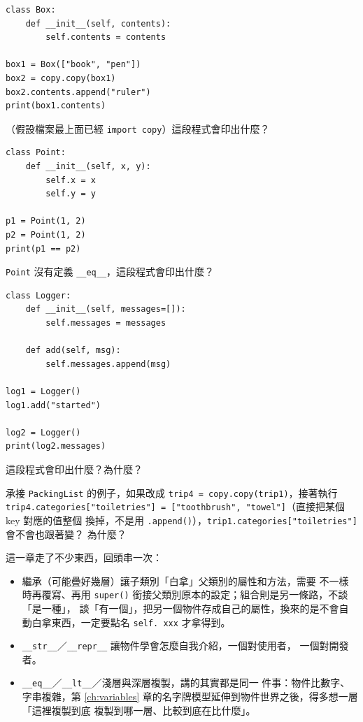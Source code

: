 \begin{drills}[label=drills:copy-and-equality]
\item
\begin{verbatim}
class Box:
    def __init__(self, contents):
        self.contents = contents

box1 = Box(["book", "pen"])
box2 = copy.copy(box1)
box2.contents.append("ruler")
print(box1.contents)
\end{verbatim}
（假設檔案最上面已經 \texttt{import copy}）這段程式會印出什麼？
\item
\begin{verbatim}
class Point:
    def __init__(self, x, y):
        self.x = x
        self.y = y

p1 = Point(1, 2)
p2 = Point(1, 2)
print(p1 == p2)
\end{verbatim}
\texttt{Point} 沒有定義 \texttt{\_\_eq\_\_}，這段程式會印出什麼？
\item
\begin{verbatim}
class Logger:
    def __init__(self, messages=[]):
        self.messages = messages

    def add(self, msg):
        self.messages.append(msg)

log1 = Logger()
log1.add("started")

log2 = Logger()
print(log2.messages)
\end{verbatim}
這段程式會印出什麼？為什麼？
\item 承接 \texttt{PackingList} 的例子，如果改成
\texttt{trip4 = copy.copy(trip1)}，接著執行
\texttt{trip4.categories["toiletries"] = ["toothbrush", "towel"]}（直接把某個 key 對應的值整個
換掉，不是用 \texttt{.append()}），\texttt{trip1.categories["toiletries"]} 會不會也跟著變？
為什麼？
\end{drills}

這一章走了不少東西，回頭串一次：

\begin{itemize}
\item 繼承（可能疊好幾層）讓子類別「白拿」父類別的屬性和方法，需要
不一樣時再覆寫、再用 \texttt{super()} 銜接父類別原本的設定；組合則是另一條路，不談「是一種」，
談「有一個」，把另一個物件存成自己的屬性，換來的是不會自動白拿東西，一定要點名 \texttt{self.
xxx} 才拿得到。
\item \texttt{\_\_str\_\_}／\texttt{\_\_repr\_\_} 讓物件學會怎麼自我介紹，一個對使用者，
一個對開發者。
\item \texttt{\_\_eq\_\_}／\texttt{\_\_lt\_\_}／淺層與深層複製，講的其實都是同一
件事：物件比數字、字串複雜，第 \ref{ch:variables} 章的名字牌模型延伸到物件世界之後，得多想一層「這裡複製到底
複製到哪一層、比較到底在比什麼」。
\end{itemize}

